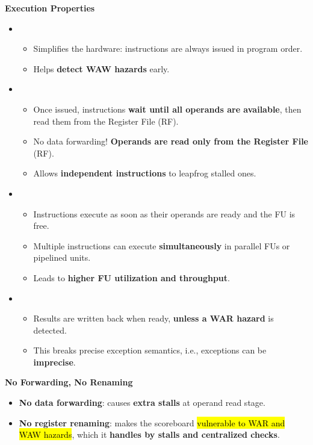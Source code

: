 \highspace
\begin{flushleft}
    \textcolor{Green3}{ \textbf{Execution Properties}}
\end{flushleft}
\begin{itemize}
    \item {}
    \begin{itemize}
        \item Simplifies the hardware: instructions are always issued in program order.
        \item Helps \textbf{detect WAW hazards} early.
    \end{itemize}

    \item {}
    \begin{itemize}
        \item Once issued, instructions \textbf{wait until all operands are available}, then read them from the Register File (RF).
        \item No data forwarding! \textbf{Operands are read only from the Register File} (RF).
        \item Allows \textbf{independent instructions} to leapfrog stalled ones.
    \end{itemize}

    \item {}
    \begin{itemize}
        \item Instructions execute as soon as their operands are ready and the FU is free.
        \item Multiple instructions can execute \textbf{simultaneously} in parallel FUs or pipelined units.
        \item Leads to \textbf{higher FU utilization and throughput}.
    \end{itemize}

    \item {}
    \begin{itemize}
        \item Results are written back when ready, \textbf{unless a WAR hazard} is detected.
        \item This breaks precise exception semantics, i.e., exceptions can be \textbf{imprecise}.
    \end{itemize}
\end{itemize}

\highspace
\begin{flushleft}
    \textcolor{Red2}{ \textbf{No Forwarding, No Renaming}}
\end{flushleft}
\begin{itemize}
    \item \textbf{No data forwarding}: causes \textbf{extra stalls} at operand read stage.
    \item \textbf{No register renaming}: makes the scoreboard \hl{vulnerable to WAR and WAW hazards}, which it \textbf{handles by stalls and centralized checks}.
\end{itemize}

